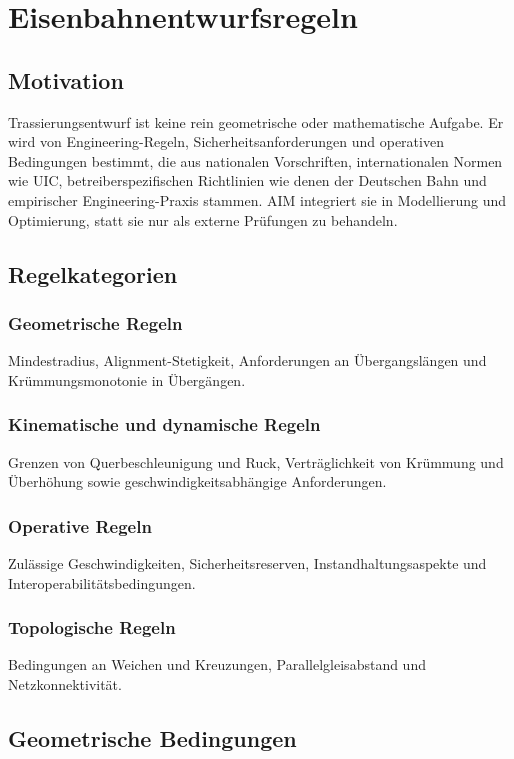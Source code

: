 \chapter{Eisenbahnentwurfsregeln}
\section*{Motivation}
Trassierungsentwurf ist keine rein geometrische oder mathematische Aufgabe. Er
wird von Engineering-Regeln, Sicherheitsanforderungen und operativen
Bedingungen bestimmt, die aus nationalen Vorschriften, internationalen Normen
wie UIC, betreiberspezifischen Richtlinien wie denen der Deutschen Bahn und
empirischer Engineering-Praxis stammen. AIM integriert sie in Modellierung und
Optimierung, statt sie nur als externe Prüfungen zu behandeln.

\section{Regelkategorien}
\subsection{Geometrische Regeln}
Mindestradius, Alignment-Stetigkeit, Anforderungen an Übergangslängen und
Krümmungsmonotonie in Übergängen.

\subsection{Kinematische und dynamische Regeln}
Grenzen von Querbeschleunigung und Ruck, Verträglichkeit von Krümmung und
Überhöhung sowie geschwindigkeitsabhängige Anforderungen.

\subsection{Operative Regeln}
Zulässige Geschwindigkeiten, Sicherheitsreserven, Instandhaltungsaspekte und
Interoperabilitätsbedingungen.

\subsection{Topologische Regeln}
Bedingungen an Weichen und Kreuzungen, Parallelgleisabstand und
Netzkonnektivität.

\section{Geometrische Bedingungen}
